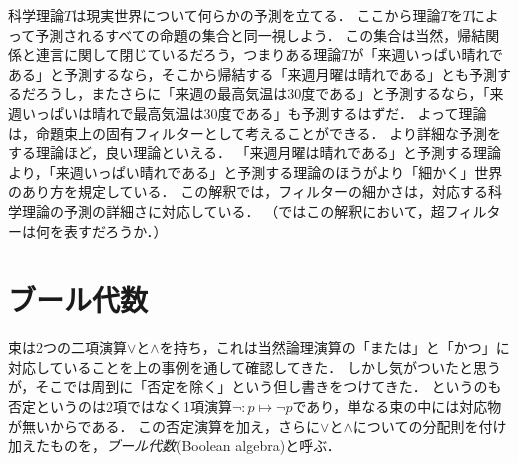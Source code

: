 \documentclass[11pt,a4paper]{jsarticle}
\begin{document}
\begin{example}[科学理論と予測の詳細さ]\label{ex:theory}
科学理論$T$は現実世界について何らかの予測を立てる．
ここから理論$T$を$T$によって予測されるすべての命題の集合と同一視しよう．
この集合は当然，帰結関係と連言に関して閉じているだろう，つまりある理論$T$が「来週いっぱい晴れである」と予測するなら，そこから帰結する「来週月曜は晴れである」とも予測するだろうし，またさらに「来週の最高気温は30度である」と予測するなら，「来週いっぱいは晴れで最高気温は30度である」も予測するはずだ．
よって理論は，命題束上の固有フィルターとして考えることができる．
より詳細な予測をする理論ほど，良い理論といえる．
「来週月曜は晴れである」と予測する理論より，「来週いっぱい晴れである」と予測する理論のほうがより「細かく」世界のあり方を規定している．
この解釈では，フィルターの細かさは，対応する科学理論の予測の詳細さに対応している．
（ではこの解釈において，超フィルターは何を表すだろうか．）
\end{example}





\section{ブール代数}

束は2つの二項演算$\vee$と$\wedge$を持ち，これは当然論理演算の「または」と「かつ」に対応していることを上の事例を通して確認してきた．
しかし気がついたと思うが，そこでは周到に「否定を除く」という但し書きをつけてきた．
というのも否定というのは2項ではなく1項演算$\neg:p \mapsto \neg p$であり，単なる束の中には対応物が無いからである．
この否定演算を加え，さらに$\vee$と$\wedge$についての分配則を付け加えたものを，\emph{ブール代数}(Boolean algebra)と呼ぶ．
\end{document}
